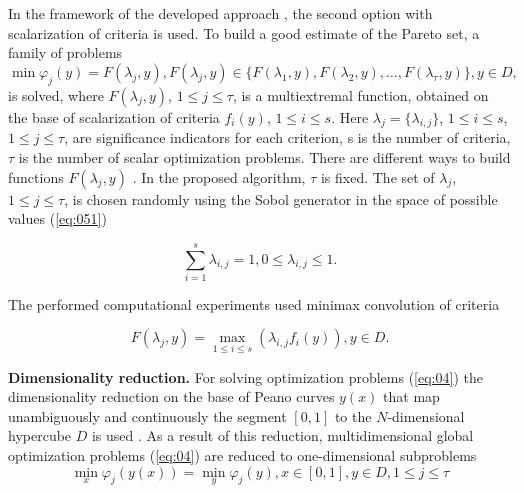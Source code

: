 \documentclass[runningheads]{llncs}
\begin{document}
In the framework of the developed approach \cite{Konnov2025}, the second option with scalarization of criteria is used. To build a good estimate of the Pareto set, a family of problems
\begin{equation}
\label{eq:04}
\min {\varphi_j (y)}=F(\lambda_j,y),F(\lambda_j,y) \in \{F(\lambda_1,y),F(\lambda_2,y),\dots,F(\lambda_\tau,y)\},y\in D,
\end{equation}
is solved,  where $F(\lambda_j,y)$, $1 \leq j \leq \tau$, is a multiextremal function, obtained on the base of scalarization of criteria $f_i(y)$, $1 \leq i \leq s$. Here $\lambda_j=\{\lambda_{i,j}\}$, $1 \leq i \leq s$, $1 \leq j \leq \tau$, are significance indicators for each criterion, s is the number of criteria, $\tau$ is the number of scalar optimization problems. There are different ways to build functions $F(\lambda_j,y)$ \cite{Miettinen1999,Konnov2025,Marler2004}.  
{\color{red} In the proposed algorithm, $\tau$ is fixed. The set of $\lambda_j$, $1 \leq j \leq \tau$, is chosen randomly using the Sobol generator\cite{Sobol2003} in the space of possible values (\ref{eq:051})}

\begin{equation}
\label{eq:051}
\sum_{i=1}^s {\lambda_{i,j}} = 1, 0 \leq \lambda_{i,j} \leq 1.
\end{equation}

The performed computational experiments used minimax convolution of criteria

\begin{equation}
\label{eq:05}
F(\lambda_j, y) = \max_{1 \leq i \leq s} \left(\lambda_{i,j} f_i (y)\right), y \in D.
\end{equation}

\textbf{Dimensionality reduction.} For solving optimization problems (\ref{eq:04}) the dimensionality reduction on the base of Peano curves $y(x)$ that map unambiguously and continuously the segment $[0,1]$ to the $N$-dimensional hypercube $D$ is used \cite{Konnov2025,Gergel2019_2,GergelKozinov2020}. As a result of this reduction, multidimensional global optimization problems (\ref{eq:04}) are reduced to one-dimensional subproblems
\begin{equation}
\label{eq:06}
\min_x {\varphi_j(y(x))} = \min_y {\varphi_j(y)}, x \in [0,1], y \in D, 1 \leq j \leq \tau
\end{equation}
\end{document}
